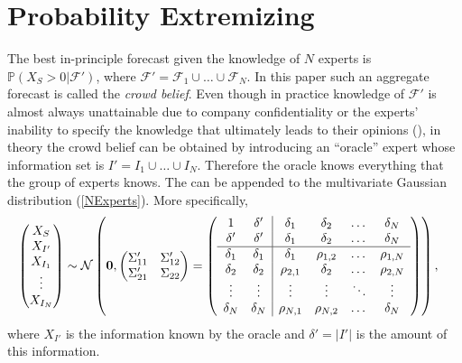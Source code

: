 \documentclass[11pt]{article}
\renewcommand{\P}{\mathbb{P}}
\theoremstyle{definition}
\theoremstyle{definition}
\begin{document}
\section{Probability Extremizing}
\label{extremizing}
The best in-principle forecast given the knowledge of $N$ experts is $\P(X_{S} > 0 |  \mathcal{F}')$, where $\mathcal{F}' = \mathcal{F}_1 \cup \dots \cup \mathcal{F}_N$. In this paper such an aggregate forecast is called the \textit{crowd belief}. Even though in practice knowledge of $\mathcal{F}'$ is almost always unattainable due to company confidentiality or the experts' inability to specify the knowledge that ultimately leads to their opinions (\citet{dawid1995coherent}), in theory the crowd belief can be obtained by introducing an ``oracle'' expert whose information set is $I' = I_1 \cup \dots \cup I_N$. Therefore the oracle  knows everything that the group of experts knows. The can be appended to the multivariate Gaussian distribution (\ref{NExperts}). More specifically, 
\begin{align*}
\left(\begin{matrix} X_S \\ X_{I'} \\ X_{I_1}\\ \vdots \\ X_{I_N} \end{matrix}\right) &\sim \mathcal{N}\left( 
 \boldsymbol{0}, \left(\begin{matrix} 
\Sigma_{11}' & \Sigma_{12}'\\
\Sigma_{21}' & \Sigma_{22}\\
 \end{matrix}\right) 
 =
 \left(\begin{array}{c c| c c cc }
1 & \delta' & \delta_1 & \delta_2 & \dots & \delta_N  \\ 
\delta' & \delta' & \delta_1 & \delta_2 & \dots & \delta_N  \\ \hline
\delta_1& \delta_1 & \delta_1 &\rho_{1,2} & \dots & \rho_{1,N}   \\ 
\delta_2 & \delta_2 &\rho_{2,1} & \delta_2 & \dots & \rho_{2,N}  \\ 
\vdots &\vdots & \vdots & \vdots & \ddots & \vdots  \\ 
\delta_N &\delta_N & \rho_{N,1} & \rho_{N,2} & \dots & \delta_N\\ 
 \end{array}\right)\right),  
\end{align*}
where  $X_{I'}$  is the information known by the oracle and $\delta' = |I'|$ is the amount of this information. 
\end{document}
